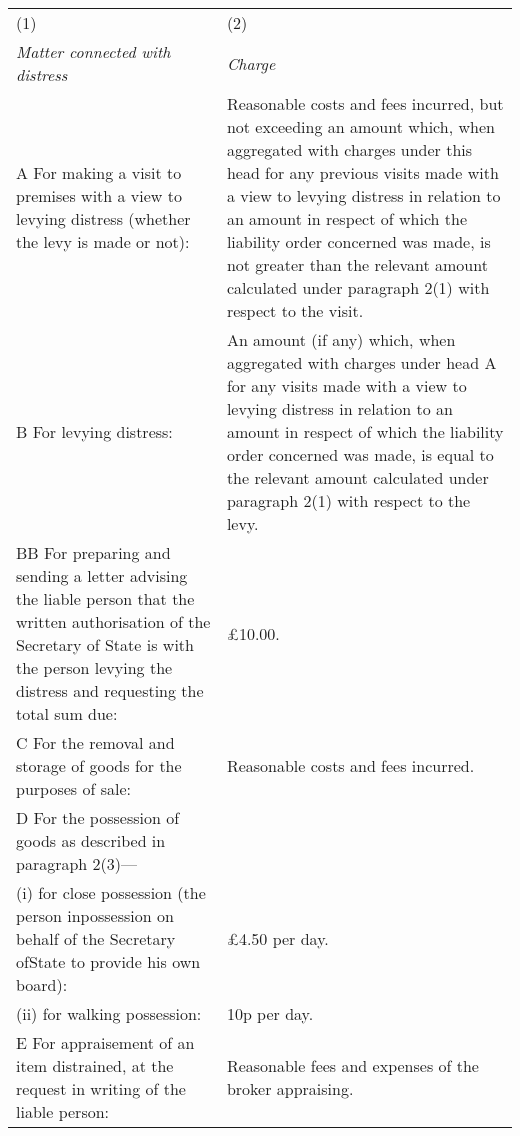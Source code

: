 \documentclass[12pt,a4paper]{article}
\begin{document}
{\noindent\footnotesize
\begin{longtable}{p{183pt}p{183pt}}
\hline
(1)&(2)\\
\itshape Matter connected with distress&\itshape Charge\\
\hline
\endhead
\hline
\endlastfoot
A {} For making a visit to premises with a view to levying distress (whether the levy is made or not):&
Reasonable costs and fees incurred, but not exceeding an amount which, when aggregated with charges under this head for any previous visits made with a view to levying distress in relation to an amount in respect of which the liability order concerned was made, is not greater than the relevant amount calculated under paragraph 2(1) with respect to the visit.\\
B {} For levying distress:&
An amount (if any) which, when aggregated with charges under head A for any visits made with a view to levying distress in relation to an amount in respect of which the liability order concerned was made, is equal to the relevant amount calculated under paragraph 2(1) with respect to the levy.\\
BB {} For preparing and sending a letter advising the liable person that the written authorisation of the Secretary of State is with the person levying the distress and requesting the total sum due: & £10.00.\\
C {} For the removal and storage of goods for the purposes of sale:&
Reasonable costs and fees incurred.\\
D {}  For the possession of goods as described in paragraph 2(3)—\\
\hspace{12pt}(i) for close possession (the person in\linebreak\hspace*{12pt}possession on behalf of the Secretary of\linebreak\hspace*{12pt}State to provide his own board):&
£4.50 per day.\\
\hspace{12pt}(ii) for walking possession:&
10p per day.\\ %
E {} For appraisement of an item distrained, at the request in writing of the liable person:&
Reasonable fees and expenses of the broker appraising.\\

\end{longtable}}
\end{document}
